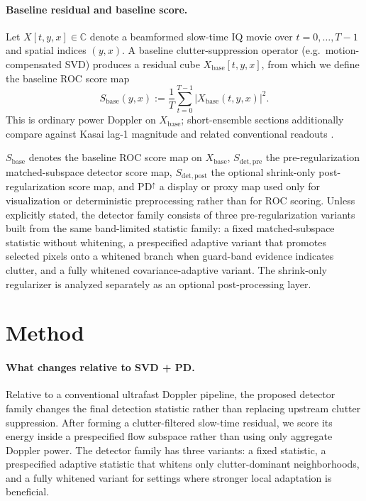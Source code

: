 \documentclass[11pt]{article}
\newif\ifPAPERONLY
\begin{document}
\paragraph{Baseline residual and baseline score.}
Let $X[t,y,x]\in\mathbb{C}$ denote a beamformed slow-time IQ movie over $t=0,\dots,T-1$ and spatial indices $(y,x)$. A baseline clutter-suppression operator (e.g.\ motion-compensated SVD) produces a residual cube $X_{\mathrm{base}}[t,y,x]$, from which we define the baseline ROC score map
\begin{equation}
  S_{\mathrm{base}}(y,x):=\frac{1}{T}\sum_{t=0}^{T-1}\left|X_{\mathrm{base}}(t,y,x)\right|^2.
  \label{eq:sbase}
\end{equation}
This is ordinary power Doppler on $X_{\mathrm{base}}$; short-ensemble sections additionally compare against Kasai lag-1 magnitude and related conventional readouts \cite{KasaiAutocorrelation1985}.
\addtocounter{table}{1}
\ifPAPERONLY
$S_{\mathrm{base}}$ denotes the baseline ROC score map on $X_{\mathrm{base}}$, and $S_{\mathrm{det}}$ the matched-subspace detector score map. Unless otherwise stated, the detector family consists of a fixed statistic, a prespecified adaptive statistic, and a fully whitened covariance-adaptive variant.
\else
$S_{\mathrm{base}}$ denotes the baseline ROC score map on $X_{\mathrm{base}}$, $S_{\mathrm{det,pre}}$ the pre-regularization matched-subspace detector score map, $S_{\mathrm{det,post}}$ the optional shrink-only post-regularization score map, and $\mathrm{PD}^{\uparrow}$ a display or proxy map used only for visualization or deterministic preprocessing rather than for ROC scoring. Unless explicitly stated, the detector family consists of three pre-regularization variants built from the same band-limited statistic family: a fixed matched-subspace statistic without whitening, a prespecified adaptive variant that promotes selected pixels onto a whitened branch when guard-band evidence indicates clutter, and a fully whitened covariance-adaptive variant. The shrink-only regularizer is analyzed separately as an optional post-processing layer.
\fi

\section{Method}
\label{sec:method}
\label{sec:stap-architecture}
\label{sec:ka-contract-v2} %

\paragraph{What changes relative to SVD + PD.}
Relative to a conventional ultrafast Doppler pipeline, the proposed detector family changes the final detection statistic rather than replacing upstream clutter suppression. After forming a clutter-filtered slow-time residual, we score its energy inside a prespecified flow subspace rather than using only aggregate Doppler power. The detector family has three variants: a fixed statistic, a prespecified adaptive statistic that whitens only clutter-dominant neighborhoods, and a fully whitened variant for settings where stronger local adaptation is beneficial.
\end{document}
